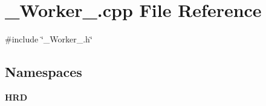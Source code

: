 \section{\+\_\+\+Worker\+\_\+.\+cpp File Reference}
\label{___worker___8cpp}
{\ttfamily \#include \char`\"{}\+\_\+\+Worker\+\_\+.\+h\char`\"{}}\newline
\subsection*{Namespaces}
\begin{DoxyCompactItemize}
\item 
 \textbf{ H\+RD}
\end{DoxyCompactItemize}
